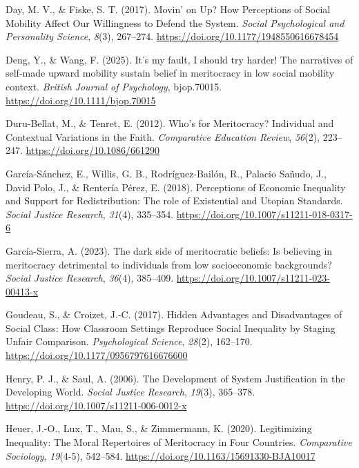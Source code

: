 \documentclass[
  13pt,
]{article}
\newlength{\cslhangindent}
\newenvironment{CSLReferences}[2] %
 {\begin{list}{}{%
  \setlength{\itemindent}{0pt}
  \setlength{\leftmargin}{0pt}
  \setlength{\parsep}{0pt}
  \ifodd #1
   \setlength{\leftmargin}{\cslhangindent}
   \setlength{\itemindent}{-1\cslhangindent}
  \fi
  \setlength{\itemsep}{#2\baselineskip}}}
 {\end{list}}
\begin{document}
\begin{CSLReferences}{1}{0}
Day, M. V., \& Fiske, S. T. (2017). Movin' on {Up}? {How Perceptions} of
{Social Mobility Affect Our Willingness} to {Defend} the {System}.
\emph{Social Psychological and Personality Science}, \emph{8}(3),
267--274. \url{https://doi.org/10.1177/1948550616678454}

Deng, Y., \& Wang, F. (2025). It's my fault, {I} should try harder!
{The} narratives of self-made upward mobility sustain belief in
meritocracy in low social mobility context. \emph{British Journal of
Psychology}, bjop.70015. \url{https://doi.org/10.1111/bjop.70015}

Duru-Bellat, M., \& Tenret, E. (2012). Who's for {Meritocracy}?
{Individual} and {Contextual Variations} in the {Faith}.
\emph{Comparative Education Review}, \emph{56}(2), 223--247.
\url{https://doi.org/10.1086/661290}

García-Sánchez, E., Willis, G. B., Rodríguez-Bailón, R., Palacio Sañudo,
J., David Polo, J., \& Rentería Pérez, E. (2018). Perceptions of
{Economic Inequality} and {Support} for {Redistribution}: {The} role of
{Existential} and {Utopian Standards}. \emph{Social Justice Research},
\emph{31}(4), 335--354. \url{https://doi.org/10.1007/s11211-018-0317-6}

García-Sierra, A. (2023). The dark side of meritocratic beliefs: {Is}
believing in meritocracy detrimental to individuals from low
socioeconomic backgrounds? \emph{Social Justice Research}, \emph{36}(4),
385--409. \url{https://doi.org/10.1007/s11211-023-00413-x}

Goudeau, S., \& Croizet, J.-C. (2017). Hidden {Advantages} and
{Disadvantages} of {Social Class}: {How Classroom Settings Reproduce
Social Inequality} by {Staging Unfair Comparison}. \emph{Psychological
Science}, \emph{28}(2), 162--170.
\url{https://doi.org/10.1177/0956797616676600}

Henry, P. J., \& Saul, A. (2006). The {Development} of {System
Justification} in the {Developing World}. \emph{Social Justice
Research}, \emph{19}(3), 365--378.
\url{https://doi.org/10.1007/s11211-006-0012-x}

Heuer, J.-O., Lux, T., Mau, S., \& Zimmermann, K. (2020). Legitimizing
{Inequality}: {The Moral Repertoires} of {Meritocracy} in {Four
Countries}. \emph{Comparative Sociology}, \emph{19}(4-5), 542--584.
\url{https://doi.org/10.1163/15691330-BJA10017}


\end{CSLReferences}
\end{document}
